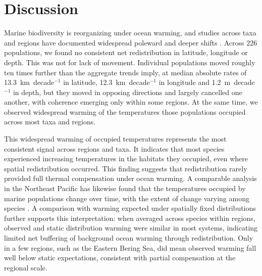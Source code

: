 \documentclass[9pt,twocolumn,twoside]{pnas-new}
\begin{document}
\section*{Discussion}

Marine biodiversity is reorganizing under ocean warming, and studies across taxa and regions have documented widespread poleward and deeper shifts \citep{poloczanska_global_2013, dulvy_climate_2008, poloczanska_responses_2016, perry_climate_2005}. Across 226 populations, we found no consistent net redistribution in latitude, longitude or depth. This was not for lack of movement. Individual populations moved roughly ten times further than the aggregate trends imply, at median absolute rates of 13.3~km~decade$^{-1}$ in latitude, 12.3~km~decade$^{-1}$ in longitude and 1.2~m~decade$^{-1}$ in depth, but they moved in opposing directions and largely cancelled one another, with coherence emerging only within some regions. At the same time, we observed widespread warming of the temperatures those populations occupied across most taxa and regions.

This widespread warming of occupied temperatures represents the most consistent signal across regions and taxa. It indicates that most species experienced increasing temperatures in the habitats they occupied, even where spatial redistribution occurred. This finding suggests that redistribution rarely provided full thermal compensation under ocean warming. A comparable analysis in the Northeast Pacific has likewise found that the temperatures occupied by marine populations change over time, with the extent of change varying among species \citep{ward_win_2024}. A comparison with warming expected under spatially fixed distributions further supports this interpretation: when averaged across species within regions, observed and static distribution warming were similar in most systems, indicating limited net buffering of background ocean warming through redistribution. Only in a few regions, such as the Eastern Bering Sea, did mean observed warming fall well below static expectations, consistent with partial compensation at the regional scale.
\end{document}
